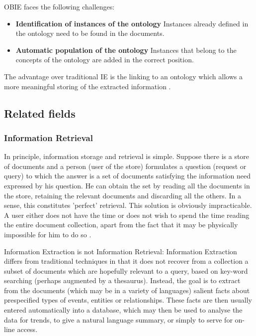 \gls{OBIE} faces the following challenges:

\begin{itemize}
\item \textbf{Identification of instances of the ontology} \newline
Instances already defined in the ontology need to be found in the documents.
\item \textbf{Automatic population of the ontology} \newline
Instances that belong to the concepts of the ontology are added in the correct position.
\end{itemize}

The advantage over traditional IE is the linking to an ontology which allows a more meaningful storing of the extracted information \cite{Maynard:2005}.


\newpage
\subsection{Related fields}

\subsubsection{Information Retrieval}
In principle, information storage and retrieval is simple. Suppose there is a store of documents and a person (user of the store) formulates a question (request or query) to which the answer is a set of documents satisfying the information need expressed by his question. He can obtain the set by reading all the documents in the store, retaining the relevant documents and discarding all the others. In a sense, this constitutes 'perfect' retrieval. This solution is obviously impracticable. A user either does not have the time or does not wish to spend the time reading the entire document collection, apart from the fact that it may be physically impossible for him to do so \cite{Rijsbergen:1979}. 

Information Extraction is not Information Retrieval: Information Extraction differs from traditional techniques in that it does not recover from a collection a subset of documents which are hopefully relevant to a query, based on key-word searching (perhaps augmented by a thesaurus). Instead, the goal is to extract from the documents (which may be in a variety of languages) salient facts about prespecified types of events, entities or relationships. These facts are then usually entered automatically into a database, which may then be used to analyse the data for trends, to give a natural language summary, or simply to serve for on-line access. \cite{GATE:IE}

